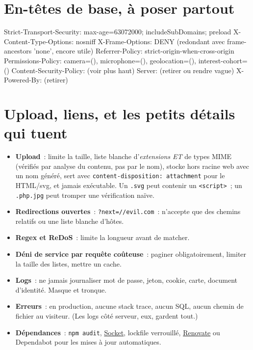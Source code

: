 \documentclass[12pt,a4paper,twoside,openright]{book}
\newcommand{\link}[2]{\href{#2}{#1}}
\begin{document}
\section{En-t\^etes de base, \`a poser partout}

\begin{codeconf}
Strict-Transport-Security: max-age=63072000; includeSubDomains; preload
X-Content-Type-Options: nosniff
X-Frame-Options: DENY                     (redondant avec frame-ancestors 'none', encore utile)
Referrer-Policy: strict-origin-when-cross-origin
Permissions-Policy: camera=(), microphone=(), geolocation=(), interest-cohort=()
Content-Security-Policy: (voir plus haut)
Server: (retirer ou rendre vague)
X-Powered-By: (retirer)
\end{codeconf}

\section{Upload, liens, et les petits d\'etails qui tuent}

\begin{itemize}
  \item \textbf{Upload}~: limite la taille, liste blanche d'\emph{extensions ET} de types MIME
        (v\'erifi\'es par analyse du contenu, pas par le nom), stocke hors racine web avec un nom
        g\'en\'er\'e, sert avec \verb|content-disposition: attachment| pour le HTML/svg, et jamais
        ex\'ecutable. Un \verb|.svg| peut contenir un \verb|<script>|~; un \verb|.php.jpg| peut
        tromper une v\'erification na\"ive.
  \item \textbf{Redirections ouvertes}~: \verb|?next=//evil.com|~: n'accepte que des chemins
        relatifs ou une liste blanche d'h\^otes.
  \item \textbf{Regex et ReDoS}~: limite la longueur avant de matcher.
  \item \textbf{D\'eni de service par requ\^ete co\^uteuse}~: paginer obligatoirement, limiter la
        taille des listes, mettre un cache.
  \item \textbf{Logs}~: ne jamais journaliser mot de passe, jeton, cookie, carte, document
        d'identit\'e. Masque et tronque.
  \item \textbf{Erreurs}~: en production, aucune stack trace, aucun SQL, aucun chemin de fichier
        au visiteur. (Les logs c\^ot\'e serveur, eux, gardent tout.)
  \item \textbf{D\'ependances}~: \verb|npm audit|, \link{Socket}{https://socket.dev/},
        lockfile verrouill\'e, \link{Renovate}{https://github.com/renovatebot/renovate} ou
        Dependabot pour les mises \`a jour automatiques.
\end{itemize}
\end{document}
